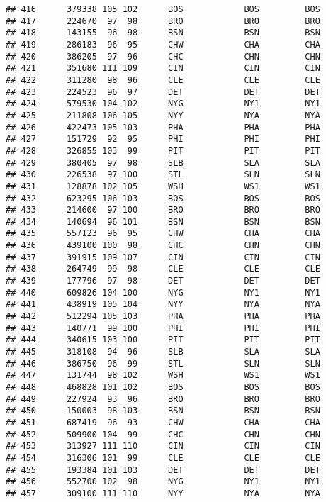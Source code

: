 \documentclass[]{article}
\begin{document}
\begin{verbatim}
## 416      379338 105 102      BOS            BOS         BOS
## 417      224670  97  98      BRO            BRO         BRO
## 418      143155  96  98      BSN            BSN         BSN
## 419      286183  96  95      CHW            CHA         CHA
## 420      386205  97  96      CHC            CHN         CHN
## 421      351680 111 109      CIN            CIN         CIN
## 422      311280  98  96      CLE            CLE         CLE
## 423      224523  96  97      DET            DET         DET
## 424      579530 104 102      NYG            NY1         NY1
## 425      211808 106 105      NYY            NYA         NYA
## 426      422473 105 103      PHA            PHA         PHA
## 427      151729  92  95      PHI            PHI         PHI
## 428      326855 103  99      PIT            PIT         PIT
## 429      380405  97  98      SLB            SLA         SLA
## 430      226538  97 100      STL            SLN         SLN
## 431      128878 102 105      WSH            WS1         WS1
## 432      623295 106 103      BOS            BOS         BOS
## 433      214600  97 100      BRO            BRO         BRO
## 434      140694  96 101      BSN            BSN         BSN
## 435      557123  96  95      CHW            CHA         CHA
## 436      439100 100  98      CHC            CHN         CHN
## 437      391915 109 107      CIN            CIN         CIN
## 438      264749  99  98      CLE            CLE         CLE
## 439      177796  97  98      DET            DET         DET
## 440      609826 104 100      NYG            NY1         NY1
## 441      438919 105 104      NYY            NYA         NYA
## 442      512294 105 103      PHA            PHA         PHA
## 443      140771  99 100      PHI            PHI         PHI
## 444      340615 103 100      PIT            PIT         PIT
## 445      318108  94  96      SLB            SLA         SLA
## 446      386750  96  99      STL            SLN         SLN
## 447      131744  98 102      WSH            WS1         WS1
## 448      468828 101 102      BOS            BOS         BOS
## 449      227924  93  96      BRO            BRO         BRO
## 450      150003  98 103      BSN            BSN         BSN
## 451      687419  96  93      CHW            CHA         CHA
## 452      509900 104  99      CHC            CHN         CHN
## 453      313927 111 110      CIN            CIN         CIN
## 454      316306 101  99      CLE            CLE         CLE
## 455      193384 101 103      DET            DET         DET
## 456      552700 102  98      NYG            NY1         NY1
## 457      309100 111 110      NYY            NYA         NYA

\end{verbatim}
\end{document}
